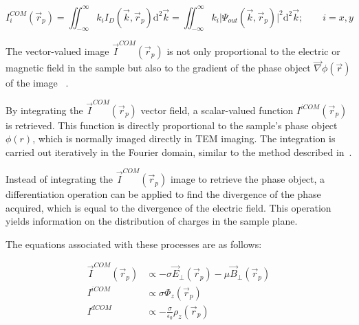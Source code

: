 \begin{equation}
    I^{COM}_{i} (\vec{r}_p) = \iint_{-\infty}^{\infty} k_{i} I_D(\vec{k}, \vec{r}_p) \mathrm{d}^2\vec{k} = \iint_{-\infty}^{\infty}k_i \vert \Psi_{out}(\vec{k},\vec{r}_p)\vert^2 \mathrm{d}^2 \vec{k}; \qquad i = x,y
    \label{eq:com_int}
\end{equation}

The vector-valued image $\vec{I}^{COM}(\vec{r}_p)$ is not only proportional to the electric or magnetic field in the sample but also to the gradient of the phase object $\vec{\nabla}\phi(\vec{r})$ of the image~ \cite{lazicPhaseContrastSTEM2016}.

By integrating the $\vec{I}^{COM}(\vec{r}_p)$ vector field, a scalar-valued function $I^{iCOM}(\vec{r}_p)$ is retrieved. 
%
This function is directly proportional to the sample's phase object $\phi(r)$, which is normally imaged directly in TEM imaging. 
%
The integration is carried out iteratively in the Fourier domain, similar to the method described in~\cite{varnavidesIterativePhaseRetrieval2023}.

Instead of integrating the $\vec{I}^{COM}(\vec{r}_p)$ image to retrieve the phase object, a  differentiation operation can be applied to find the divergence of the phase acquired, which is equal to the divergence of the electric field. This operation yields information on the distribution of charges in the sample plane.

The equations associated with these processes are as follows:

\begin{align}
    \vec{I}^{COM}(\vec{r}_p) &\propto -\sigma\vec{E}_{\perp}(\vec{r}_p) - \mu \vec{B}_{\perp}(\vec{r}_p)\\
    I^{iCOM} &\propto \sigma \Phi_z(\vec{r}_p)\\
    I^{dCOM} &\propto -\frac{\sigma}{\epsilon_0}\rho_z(\vec{r}_p) 
\end{align}
